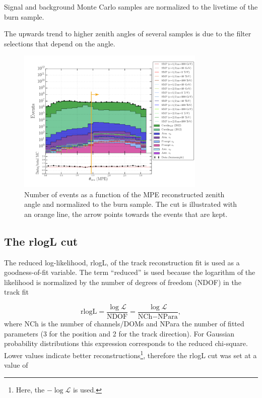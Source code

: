 Signal and background Monte Carlo samples are normalized to the livetime of the burn sample.

The upwards trend to higher zenith angles of several samples is due to the filter selections that depend on the angle. 

\begin{figure}[t]
\centering
\includegraphics[width=0.8\textwidth]{chapter8/img/1D_stack_mpefit_zenith_final.png}
\caption{Number of events as a function of the MPE reconstructed zenith angle and normalized to the burn sample. The cut is illustrated with an orange line, the arrow points towards the events that are kept.}
\label{fig:level3cutszenith}
\end{figure}


\subsection{The rlogL cut}
The reduced log-likelihood, rlogL, of the track reconstruction fit is used as a goodness-of-fit variable. The term ``reduced'' is used because the logarithm of the likelihood is normalized by the number of degrees of freedom (NDOF) in the track fit

\begin{equation}
\textrm{rlogL} = \frac{\log \mathcal{L}}{\textrm{NDOF}} = \frac{\log \mathcal{L}}{\textrm{NCh} - \textrm{NPara}},
\end{equation}
where NCh is the number of channels/DOMs and NPara the number of fitted parameters (3 for the position and 2 for the track direction). For Gaussian probability distributions this expression corresponds to the reduced chi-square. Lower values indicate better reconstructions\footnote{Here, the $-\log \mathcal{L}$ is used.}, therefore the rlogL cut was set at a value of 

